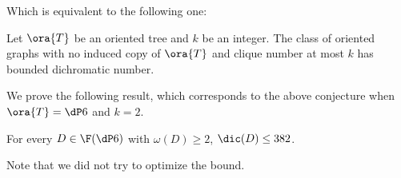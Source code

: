 Which is equivalent to the following one:

\begin{conjecture}
    Let $\ora{T}$ be an oriented tree and $k$ be an integer. The class of oriented graphs with no induced copy of $\ora{T}$ and clique number at most $k$ has bounded dichromatic number.
\end{conjecture}

We prove the following result, which corresponds to the above conjecture when $\ora{T} = \dP6$ and $k = 2$. 

\begin{theorem}\label{thm:main_thm}
For every $D \in \F(\dP6)$ with $\omega(D) \geq 2$, $ \dic(D) \leq 382$.
\end{theorem}

Note that we did not try to optimize the bound.  



